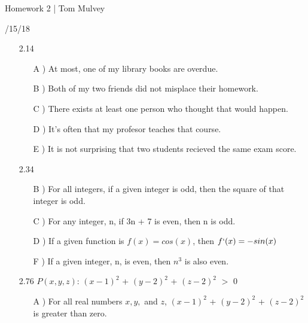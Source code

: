 \documentclass[12pt]{article}
\newcommand{\ind}{\hspace{10mm}}
\begin{document}
\centerline{\sc \large Homework 2 | Tom Mulvey }

\centerline{/15/18}

\vspace{2pc}

\begin{enumerate}

\item[2.14]

   \begin{enumerate}

      \item[A] ) At most, one of my library books are overdue.

      \item[B] ) Both of my two friends did not misplace their homework.

      \item[C] ) There exists at least one person who thought that would happen.

      \item[D] ) It's often that my profesor teaches that course.

      \item[E] ) It is not surprising that two students recieved the same exam        score.
		

   \end{enumerate}


\item[2.34]

   \begin{enumerate}

      \item[B] ) For all integers, if a given integer is odd, then the square of that integer is odd.

      \item[C] ) For any integer, n, if 3n + 7 is even, then n is odd.

      \item[D] ) If a given function is $f(x)=cos(x)$, then $f`(x)=-sin(x)$

      \item[F] ) If a given integer, n, is even, then $n^3$ is also even.
		

   \end{enumerate}


\item[2.76]
\ind$P(x,y,z)$: $(x-1)^2$ + $(y-2)^2$ + $(z-2)^2$ $>$ 0 
   \begin{enumerate}

      \item[A] ) For all real numbers $x,y, $ and $ z$, $(x-1)^2$ + $(y-2)^2$ + $(z-2)^2$ is greater than zero. 


\end{enumerate}
\end{enumerate}
\end{document}
